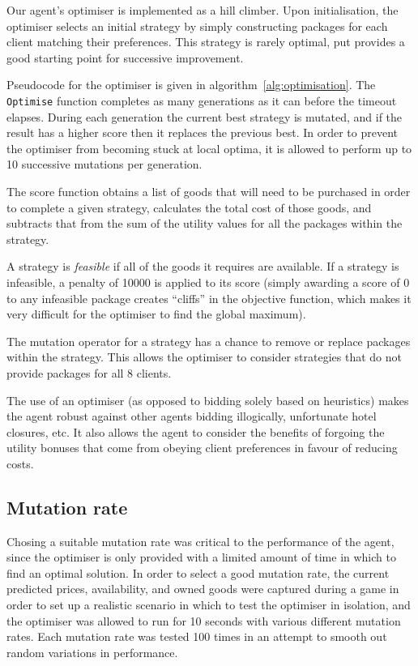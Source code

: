 \documentclass{acm_proc_article-sp}
\begin{document}
Our agent's optimiser is implemented as a hill climber. Upon initialisation, the optimiser selects an initial strategy by simply constructing packages for each client matching their preferences. This strategy is rarely optimal, put provides a good starting point for successive improvement.

Pseudocode for the optimiser is given in algorithm~\ref{alg:optimisation}. The \texttt{Optimise} function completes as many generations as it can before the timeout elapses. During each generation the current best strategy is mutated, and if the result has a higher score then it replaces the previous best. In order to prevent the optimiser from becoming stuck at local optima, it is allowed to perform up to 10 successive mutations per generation.

The score function obtains a list of goods that will need to be purchased in order to complete a given strategy, calculates the total cost of those goods, and subtracts that from the sum of the utility values for all the packages within the strategy.

A strategy is \emph{feasible} if all of the goods it requires are available. If a strategy is infeasible, a penalty of 10000 is applied to its score (simply awarding a score of 0 to any infeasible package creates ``cliffs'' in the objective function, which makes it very difficult for the optimiser to find the global maximum).

The mutation operator for a strategy has a chance to remove or replace packages within the strategy. This allows the optimiser to consider strategies that do not provide packages for all 8 clients.

The use of an optimiser (as opposed to bidding solely based on heuristics) makes the agent robust against other agents bidding illogically, unfortunate hotel closures, etc. It also allows the agent to consider the benefits of forgoing the utility bonuses that come from obeying client preferences in favour of reducing costs.

\subsection{Mutation rate}

Chosing a suitable mutation rate was critical to the performance of the agent, since the optimiser is only provided with a limited amount of time in which to find an optimal solution. In order to select a good mutation rate, the current predicted prices, availability, and owned goods were captured during a game in order to set up a realistic scenario in which to test the optimiser in isolation, and the optimiser was allowed to run for 10 seconds with various different mutation rates. Each mutation rate was tested 100 times in an attempt to smooth out random variations in performance.
\end{document}
